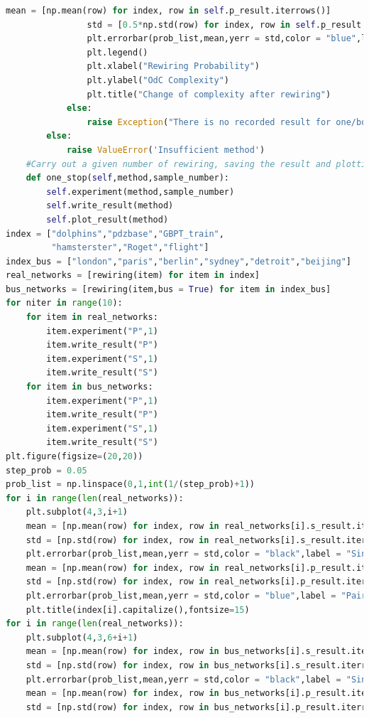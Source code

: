 \documentclass[12pt]{article}
\begin{document}
{\begin{lstlisting}[breaklines=true,language=Python]
                mean = [np.mean(row) for index, row in self.p_result.iterrows()]
                std = [0.5*np.std(row) for index, row in self.p_result.iterrows()]
                plt.errorbar(prob_list,mean,yerr = std,color = "blue",label = "Pairwise rewiring")
                plt.legend()
                plt.xlabel("Rewiring Probability")
                plt.ylabel("OdC Complexity")
                plt.title("Change of complexity after rewiring")
            else:
                raise Exception("There is no recorded result for one/both of the methods.")
        else:
            raise ValueError('Insufficient method')
    #Carry out a given number of rewiring, saving the result and plotting at the same time.
    def one_stop(self,method,sample_number):
        self.experiment(method,sample_number)
        self.write_result(method)
        self.plot_result(method)
index = ["dolphins","pdzbase","GBPT_train",
         "hamsterster","Roget","flight"]
index_bus = ["london","paris","berlin","sydney","detroit","beijing"]
real_networks = [rewiring(item) for item in index]
bus_networks = [rewiring(item,bus = True) for item in index_bus]
for niter in range(10):
    for item in real_networks:
        item.experiment("P",1)
        item.write_result("P")
        item.experiment("S",1)
        item.write_result("S")
    for item in bus_networks:
        item.experiment("P",1)
        item.write_result("P")
        item.experiment("S",1)
        item.write_result("S")
plt.figure(figsize=(20,20))
step_prob = 0.05
prob_list = np.linspace(0,1,int(1/(step_prob)+1))
for i in range(len(real_networks)):
    plt.subplot(4,3,i+1)
    mean = [np.mean(row) for index, row in real_networks[i].s_result.iterrows()]
    std = [np.std(row) for index, row in real_networks[i].s_result.iterrows()]
    plt.errorbar(prob_list,mean,yerr = std,color = "black",label = "Single link rewiring")
    mean = [np.mean(row) for index, row in real_networks[i].p_result.iterrows()]
    std = [np.std(row) for index, row in real_networks[i].p_result.iterrows()]
    plt.errorbar(prob_list,mean,yerr = std,color = "blue",label = "Pairwise rewiring")
    plt.title(index[i].capitalize(),fontsize=15)
for i in range(len(real_networks)):
    plt.subplot(4,3,6+i+1)
    mean = [np.mean(row) for index, row in bus_networks[i].s_result.iterrows()]
    std = [np.std(row) for index, row in bus_networks[i].s_result.iterrows()]
    plt.errorbar(prob_list,mean,yerr = std,color = "black",label = "Single link rewiring")
    mean = [np.mean(row) for index, row in bus_networks[i].p_result.iterrows()]
    std = [np.std(row) for index, row in bus_networks[i].p_result.iterrows()]

\end{lstlisting}}
\end{document}
